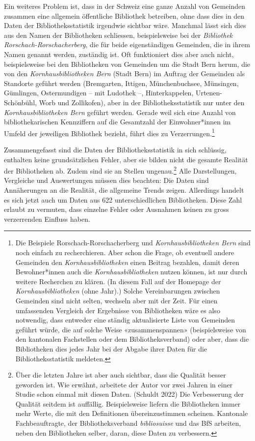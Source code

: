 \documentclass[a4paper,
fontsize=11pt,
oneside,
numbers=noperiodatend,
parskip=half-,
bibliography=totoc,
final
]{scrartcl}
\begin{document}
Ein weiteres Problem ist, dass in der Schweiz eine ganze Anzahl von
Gemeinden zusammen eine allgemein öffentliche Bibliothek betreiben, ohne
dass dies in den Daten der Bibliotheksstatistik irgendwie sichtbar wäre.
Manchmal lässt sich dies aus den Namen der Bibliotheken schliessen,
beispielsweise bei der \emph{Bibliothek Rorschach-Rorschacherberg}, die
für beide eigenständigen Gemeinden, die in ihrem Namen genannt werden,
zuständig ist. Oft funktioniert dies aber auch nicht, beispielsweise bei
den Bibliotheken von Gemeinden um die Stadt Bern herum, die von den
\emph{Kornhausbibliotheken Bern} (Stadt Bern) im Auftrag der Gemeinden
als Standorte geführt werden (Bremgarten, Ittigen, Münchenbuchsee,
Münsingen, Gümlingen, Ostermundigen -- mit Ludothek --, Hinterkappelen,
Urtenen-Schönbühl, Worb und Zollikofen), aber in der
Bibliotheksstatistik nur unter den \emph{Kornhausbibliotheken Bern}
geführt werden. Gerade weil sich eine Anzahl von bibliothekarischen
Kennziffern auf die Gesamtzahl der Einwohner*innen im Umfeld der
jeweiligen Bibliothek bezieht, führt dies zu Verzerrungen.\footnote{Die
  Beispiele Rorschach-Rorschacherberg und \emph{Kornhausbibliotheken
  Bern} sind noch einfach zu recherchieren. Aber schon die Frage, ob
  eventuell andere Gemeinden den \emph{Kornhausbibliotheken} einen
  Beitrag bezahlen, damit deren Bewohner*innen auch die
  \emph{Kornhausbibliotheken} nutzen können, ist nur durch weitere
  Recherchen zu klären. (In diesem Fall auf der Homepage der
  \emph{Kornhausbibliotheken} (ohne Jahr).) Solche Vereinbarungen
  zwischen Gemeinden sind nicht selten, wechseln aber mit der Zeit. Für
  einen umfassenden Vergleich der Ergebnisse von Bibliotheken wäre es
  also notwendig, dass entweder eine ständig aktualisierte Liste von
  Gemeinden geführt würde, die auf solche Weise «zusammenspannen»
  (beispielsweise von den kantonalen Fachstellen oder dem
  Bibliotheksverband) oder aber, dass die Bibliotheken dies jedes Jahr
  bei der Abgabe ihrer Daten für die Bibliotheksstatistik meldeten.}

Zusammengefasst sind die Daten der Bibliotheksstatistik in sich
schlüssig, enthalten keine \linebreak grundsätzlichen Fehler, aber sie bilden nicht
die gesamte Realität der Bibliotheken ab. Zudem sind sie an Stellen
ungenau.\footnote{Über die letzten Jahre ist aber auch sichtbar, dass
  die Qualität besser geworden ist. Wie erwähnt, arbeitete der Autor vor
  zwei Jahren in einer Studie schon einmal mit diesen Daten. (Schuldt
  2022) Die Verbesserung der Qualität seitdem ist auffällig.
  Beispielsweise liefern die Bibliotheken immer mehr Werte, die mit den
  Definitionen übereinzustimmen scheinen. Kantonale Fachbeauftragte, der
  Bibliotheksverband \emph{bibliosuisse} und das BfS arbeiten, neben den
  Bibliotheken selber, daran, diese Daten zu verbessern.} Alle
Darstellungen, Vergleiche und Auswertungen müssen dies beachten: Die
Daten sind Annäherungen an die Realität, die allgemeine Trends zeigen.
Allerdings handelt es sich jetzt auch um Daten aus 622 unterschiedlichen
Bibliotheken. Diese Zahl erlaubt zu vermuten, dass einzelne Fehler oder
Ausnahmen keinen zu gross verzerrenden Einfluss haben.
\end{document}
